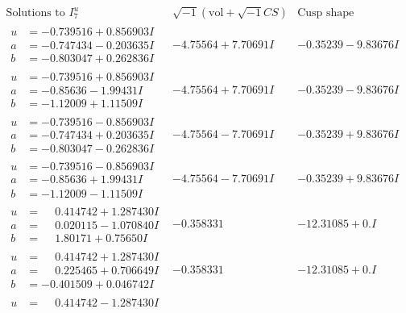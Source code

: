 \documentclass[1p]{elsarticle_modified}
\theoremstyle{definition}
\newcommand{\I}{\sqrt{-1}}
\begin{document}
$$\begin{array}{c|c|c}  
\text{Solutions to }I^u_{7}& \I (\text{vol} + \sqrt{-1}CS) & \text{Cusp shape}\\
 \hline 
\begin{aligned}
u &= -0.739516 + 0.856903 I \\
a &= -0.747434 - 0.203635 I \\
b &= -0.803047 + 0.262836 I\end{aligned}
 & -4.75564 + 7.70691 I & -0.35239 - 9.83676 I \\ \hline\begin{aligned}
u &= -0.739516 + 0.856903 I \\
a &= -0.85636 - 1.99431 I \\
b &= -1.12009 + 1.11509 I\end{aligned}
 & -4.75564 + 7.70691 I & -0.35239 - 9.83676 I \\ \hline\begin{aligned}
u &= -0.739516 - 0.856903 I \\
a &= -0.747434 + 0.203635 I \\
b &= -0.803047 - 0.262836 I\end{aligned}
 & -4.75564 - 7.70691 I & -0.35239 + 9.83676 I \\ \hline\begin{aligned}
u &= -0.739516 - 0.856903 I \\
a &= -0.85636 + 1.99431 I \\
b &= -1.12009 - 1.11509 I\end{aligned}
 & -4.75564 - 7.70691 I & -0.35239 + 9.83676 I \\ \hline\begin{aligned}
u &= \phantom{-}0.414742 + 1.287430 I \\
a &= \phantom{-}0.020115 - 1.070840 I \\
b &= \phantom{-}1.80171 + 0.75650 I\end{aligned}
 & -0.358331\phantom{ +0.000000I} & -12.31085 + 0. I\phantom{ +0.000000I} \\ \hline\begin{aligned}
u &= \phantom{-}0.414742 + 1.287430 I \\
a &= \phantom{-}0.225465 + 0.706649 I \\
b &= -0.401509 + 0.046742 I\end{aligned}
 & -0.358331\phantom{ +0.000000I} & -12.31085 + 0. I\phantom{ +0.000000I} \\ \hline\begin{aligned}
u &= \phantom{-}0.414742 - 1.287430 I \\

\end{aligned}
\end{array}$$
\end{document}
